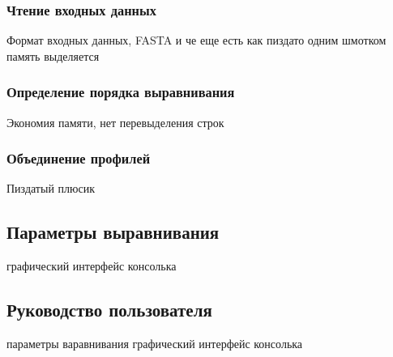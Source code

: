 \subsubsection[Чтение входных данных]{\large Чтение входных данных}
\hspace{\parindent} Формат входных данных, FASTA и че еще есть
как пиздато одним шмотком память выделяется

\subsubsection[Определение порядка выравнивания]{\large Определение порядка выравнивания}
\hspace{\parindent} Экономия памяти, нет перевыделения строк

\subsubsection[Объединение профилей]{\large Объединение профилей}
\hspace{\parindent} Пиздатый плюсик

\subsection[Параметры выравнивания]{\large Параметры выравнивания}
\hspace{\parindent} графический интерфейс консолька

\subsection[Руководство пользователя]{\large Руководство пользователя}
\hspace{\parindent} параметры варавнивания графический интерфейс консолька